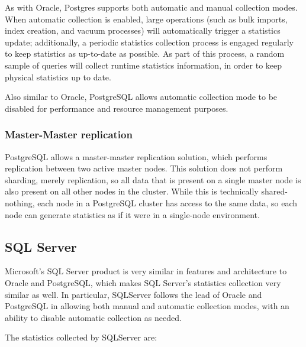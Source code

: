 As with Oracle, Postgres supports both automatic and manual collection modes. When automatic collection is enabled, large operations (such as bulk imports, index creation, and vacuum processes) will automatically trigger a statistics update; additionally, a periodic statistics collection process is engaged regularly to keep statistics as up-to-date as possible. As part of this process, a random sample of queries will collect runtime statistics information, in order to keep physical statistics up to date. 

Also similar to Oracle, PostgreSQL allows automatic collection mode to be disabled for performance and resource management purposes.

\subsubsection{Master-Master replication}
PostgreSQL allows a master-master replication solution, which performs replication between two active master nodes\cite{PGReplication}. This solution does not perform sharding, merely replication, so all data that is present on a single master node is also present on all other nodes in the cluster. While this is technically shared-nothing, each node in a PostgreSQL cluster has access to the same data, so each node can generate statistics as if it were in a single-node environment.

\subsection{SQL Server}
Microsoft's SQL Server product is very similar in features and architecture to Oracle and PostgreSQL, which makes SQL Server's statistics collection very similar as well. In particular, SQLServer follows the lead of Oracle and PostgreSQL in allowing both manual and automatic collection modes, with an ability to disable automatic collection as needed.

The statistics collected by SQLServer are\cite{SQLServerStats}:

